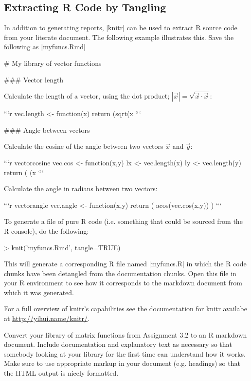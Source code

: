 \subsection{Extracting R Code by Tangling}

In addition to generating reports, |knitr| can be used to extract R source code from your literate document.  The following example illustrates this. Save the following as |myfuncs.Rmd|

\begin{codeblock}
# My library of vector functions

### Vector length

Calculate the length of a vector, using the dot product;
$|\vec{x}| = \sqrt{\vec{x} \cdot \vec{x}}$:

```{r}
vec.length <- function(x){
  return (sqrt(x %
}
```

### Angle between vectors

Calculate the cosine of the angle between
two vectors $\vec{x}$ and $\vec{y}$:

```{r vectorcosine}
vec.cos <- function(x,y){
  lx <- vec.length(x)
  ly <- vec.length(y)
  return ( (x %
}
```

Calculate the angle in radians between two vectors:

```{r vectorangle}
vec.angle <- function(x,y){
  return ( acos(vec.cos(x,y)) )
}
```

\end{codeblock}

To generate a file of pure R code (i.e. something that could be sourced from the R console), do the following:
%
\begin{R}
> knit('myfuncs.Rmd', tangle=TRUE)
\end{R}
%
This will generate a corresponding R file named |myfuncs.R| in which the R code chunks have been detangled from the documentation chunks.  Open this file in your R environment to see how it corresponds to the markdown document from which it was generated.

For a full overview of knitr's capabilities see the documentation for knitr availabe at \url{http://yihui.name/knitr/}.

\medskip
\begin{assignment}
Convert your library of matrix functions from Assignment 3.2 to an R markdown document. Include documentation and explanatory text as necessary so that somebody looking at your library for the first time can understand how it works.  Make sure to use appropriate markup in your document (e.g. headings) so that the HTML output is nicely formatted.
\end{assignment}

